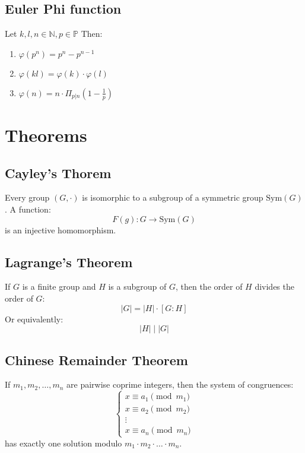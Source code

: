\documentclass{article}
\begin{document}
\subsection{Euler Phi function}

Let \(k,l,n \in \mathbb{N}, p\in \mathbb{P}\) Then:
\begin{enumerate}
    \item \(\varphi(p^n) = p^n - p^{n-1} \)
    \item \(\varphi(kl) = \varphi(k) \cdot \varphi(l)\)
    \item \(\varphi(n) = n\cdot \Pi_{p|n} \left(1-\frac{1}{p}\right)\)
\end{enumerate}

\section{Theorems}

\subsection{Cayley's Thorem}

Every group \((G,\cdot)\) is isomorphic to a subgroup of a symmetric group $\text{Sym}(G)$. A function:
\[
F(g) : G \rightarrow \text{Sym}(G)
\]
is an injective homomorphism.

\subsection{Lagrange's Theorem}

If \( G \) is a finite group and \( H \) is a subgroup of \( G \), then the order of \( H \) divides the order of \( G \):
\[ |G| = |H| \cdot [G : H] \]
Or equivalently:
\[ |H| \mid |G| \]

\subsection{Chinese Remainder Theorem}

If \( m_1, m_2, \ldots, m_n \) are pairwise coprime integers, then the system of congruences:
\[ \begin{cases} x \equiv a_1 \pmod{m_1} \\ x \equiv a_2 \pmod{m_2} \\ \vdots \\ x \equiv a_n \pmod{m_n} \end{cases} \]
has exactly one solution modulo \( m_1 \cdot m_2 \cdot \ldots \cdot m_n \).
\end{document}
